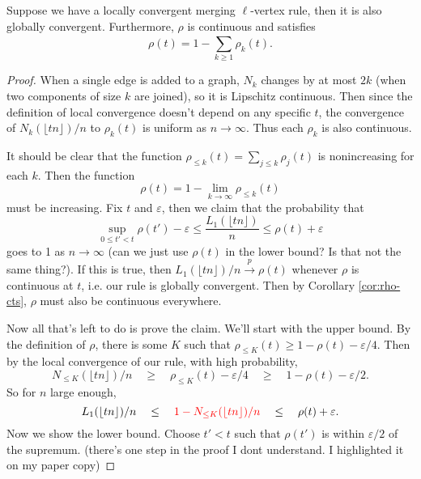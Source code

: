 \documentclass[twoside,10pt]{report}
\begin{document}
\setcounter{thrm}{2}
\begin{thrm}[]
Suppose we have a locally convergent merging $\ell$-vertex rule, then it is also globally convergent. Furthermore, $\rho$ is continuous and satisfies
\[
	\rho(t) = 1 - \sum_{k \geq 1}^{} \rho_{k}(t).
\] 
\end{thrm}
\begin{proof}
	When a single edge is added to a graph, $N_{k}$ changes by at most $2k$ (when two components of size $k$ are joined), so it is Lipschitz continuous. Then since the definition of local convergence doesn't depend on any specific $t$, the convergence of $N_{k}(\lfloor t n \rfloor)/n$ to $\rho_{k}(t)$ is uniform as $n\to \infty$. Thus each $\rho_{k}$ is also continuous.

	It should be clear that the function $\rho_{\leq k}(t) = \sum_{j \leq k}\rho_{j}(t)$ is nonincreasing for each $k$. Then the function
	\[
		\rho(t) = 1 - \lim_{k \to \infty} \rho_{\leq k}(t)
	\] must be increasing. Fix $t$ and $\varepsilon$, then we claim that the probability that
	\[
		\sup_{0 \leq t' < t} \rho(t') - \varepsilon \leq \frac{L_1(\lfloor tn \rfloor)}{n} \leq \rho(t) + \varepsilon
	\] goes to 1 as $n\to \infty$ {\color{red}(can we just use $\rho(t)$ in the lower bound? Is that not the same thing?)}. If this is true, then $L_1(\lfloor tn \rfloor)/n \stackrel{p}{\to } \rho(t)$ whenever $\rho$ is continuous at $t$, i.e. our rule is globally convergent. Then by Corollary \ref{cor:rho-cts}, $\rho$ must also be continuous everywhere.

	Now all that's left to do is prove the claim. We'll start with the upper bound. By the definition of $\rho$, there is some $K$ such that $\rho_{\leq K}(t) \geq 1 - \rho(t) - \varepsilon/4$. Then by the local convergence of our rule, with high probability,
	\[
		N_{\leq K}(\lfloor tn \rfloor)/n \quad\geq\quad \rho_{\leq K}(t) - \varepsilon/4 \quad\geq\quad 1 - \rho(t) - \varepsilon/2.
	\] So for $n$ large enough,
	\[
		L_1(\lfloor tn \rfloor)/n \quad\leq\quad {\color{red}1 - N_{\leq K}(\lfloor tn \rfloor)/n} \quad\leq\quad \rho(t) + \varepsilon.
	\] Now we show the lower bound. Choose $t' < t$ such that $\rho(t')$ is within $\varepsilon/2$ of the supremum. {\color{red}(there's one step in the proof I dont understand. I highlighted it on my paper copy)}
\end{proof}
\end{document}
